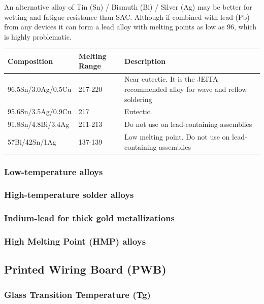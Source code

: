\documentclass{article}
\begin{document}
		An alternative alloy of Tin (Sn) / Bismuth (Bi) / Silver (Ag) may be better for wetting and fatigue resistance than SAC.
		Although if combined with lead (Pb) from any devices it can form a lead alloy with melting points as low as 96\degree , which is highly problematic.
		 \begin{center}
 			\begin{tabular}{| m{10em} | m{5em}| m{17em} |} 
 			\hline
 			\textbf{Composition} & \textbf{Melting Range} & \textbf{Description} \\ [0.5ex] 
 			\hline\hline
 			96.5Sn/3.0Ag/0.5Cu & 217-220\degree & Near eutectic. It is the JEITA recommended alloy for wave and reflow soldering \\ 
 			\hline
 			95.6Sn/3.5Ag/0.9Cu & 217\degree & Eutectic. \\ 
 			\hline
 			91.8Sn/4.8Bi/3.4Ag & 211-213\degree & Do not use on lead-containing assemblies \\
 			\hline
 			57Bi/42Sn/1Ag & 137-139\degree & Low melting point. Do not use on lead-containing assemblies  \\
 			\hline
			\end{tabular}
		\end{center}
		
		\subsubsection{Low-temperature alloys}
		
		\subsubsection{High-temperature solder alloys}
		
		
		\subsubsection{Indium-lead for thick gold metallizations}
		
		
		\subsubsection{High Melting Point (HMP) alloys}
	
	\subsection{Printed Wiring Board (PWB)}
		\subsubsection{Glass Transition Temperature (Tg)}
\end{document}

